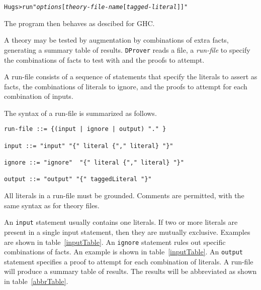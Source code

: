 \begin{alltt}
Hugs> run "\emph{options} [\emph{theory-file-name} [\emph{tagged-literal}]]"
\end{alltt}

\noindent The program then behaves as descibed for GHC.



A theory may be tested by augmentation by combinations of extra facts,
generating a summary table of results. {\tt DProver}
reads a file, a {\it run-file} to specify the combinations
of facts to test with and the proofs to attempt.

A run-file consists of a sequence of statements
that specify the literals to assert as facts,
the combinations of literals to ignore, and the 
proofs to attempt for each combination of inputs.

The syntax of a run-file is summarized as follows.

\begin{Verbatim}
run-file ::= {(input | ignore | output) "." }

input ::= "input" "{" literal {"," literal} "}"

ignore ::= "ignore"  "{" literal {"," literal} "}"

output ::= "output" "{" taggedLiteral "}"
\end{Verbatim}

All literals in a run-file must be grounded.
Comments are permitted, with the same syntax
as for theory files.

An {\tt input} statement usually contains one
literals. If two or more literals are present
in a single input statement,
then they are mutually exclusive. Examples are
shown in table~\ref{inputTable}.
An {\tt ignore} statement rules out specific
combinations of facts. An example is shown in 
table~\ref{inputTable}.
An {\tt output} statement specifies a proof to attempt
for each combination of literals.
A run-file will produce a summary table of results.
The results will be abbreviated as shown in table~\ref{abbrTable}.

